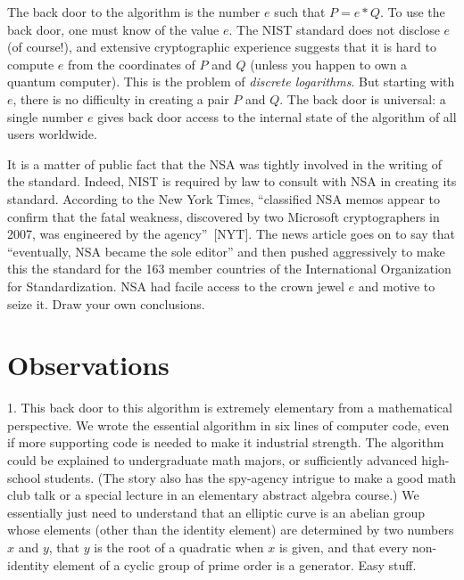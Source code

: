 \documentclass[11pt]{amsart} %
\begin{document}
The back door to the algorithm is the number $e$  such that $P = e * Q$. To use the back door,
one must  know of the value $e$.  The NIST standard
does not disclose $e$ (of course!), 
and extensive cryptographic experience suggests that it is hard to compute $e$
from the coordinates of $P$ and $Q$ (unless you happen to own a quantum computer).   
This is the problem of {\it discrete logarithms}.
But starting with $e$, there is no difficulty
in creating a pair $P$ and $Q$.  The back door is universal: a single number $e$ gives
back door access to the internal state of the algorithm of all users worldwide.

It is a matter of public fact that the NSA was tightly involved in the writing
of the standard.   Indeed, NIST is required by law to consult with NSA in creating its standard.  
According to the New York Times, 
``classified NSA memos appear to confirm that the fatal weakness, discovered by two Microsoft cryptographers in 2007, was engineered by the agency''~[NYT].
The news article goes on to say that ``eventually, NSA became the sole editor'' and then pushed aggressively to make this the standard for
the 163 member countries of the International Organization for Standardization.
NSA had facile access to the crown jewel $e$ and motive to seize it.  Draw your own conclusions.

% 

\section{Observations}

1.  This back door to this algorithm is extremely elementary from a mathematical perspective.  We wrote 
the essential algorithm in six lines of computer code, even if more supporting code is needed to make it industrial strength.
The algorithm could be explained to undergraduate math majors, or sufficiently advanced high-school students.
(The story also has the spy-agency intrigue to make a good math club talk or a special lecture in an
elementary abstract algebra course.)
We essentially just need to understand that an elliptic curve is an abelian group whose elements 
(other than the identity element) are
determined by two numbers $x$ and $y$, that $y$ is the root of a quadratic when $x$ is given,
and that every non-identity element of a cyclic group of prime order is a generator.
Easy stuff.
\end{document}
